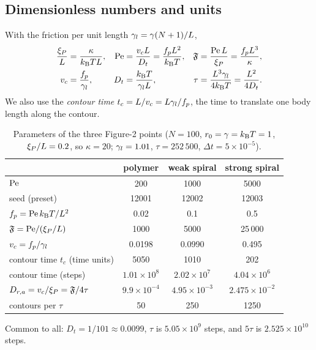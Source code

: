 \documentclass[11pt]{article}
\begin{document}
\subsection{Dimensionless numbers and units}
With the friction per unit length $\gamma_{l}=\gamma(N+1)/L$,
\begin{align}
\frac{\xi_{P}}{L}&=\frac{\kappa}{k_{\mathrm{B}}T L}, &
\mathrm{Pe}&=\frac{v_cL}{D_t}=\frac{f_pL^2}{k_{\mathrm{B}}T}, &
\mathfrak{F}&=\frac{\mathrm{Pe}\,L}{\xi_{P}}=\frac{f_pL^3}{\kappa}, \\
v_c&=\frac{f_p}{\gamma_{l}}, & D_t&=\frac{k_{\mathrm{B}}T}{\gamma_{l} L}, & \tau&=\frac{L^3\gamma_{l}}{4k_{\mathrm{B}}T}=\frac{L^2}{4D_t}.
\end{align}
We also use the \emph{contour time} $t_c=L/v_c=L\gamma_{l}/f_p$, the time to translate one body length along the contour.
\begin{table}[H]\centering\small
\caption{Parameters of the three Figure-2 points ($N=100$, $r_0=\gamma=k_{\mathrm{B}}T=1$, $\xi_{P}/L=0.2$, so $\kappa=20$; $\gamma_{l}=1.01$, $\tau=252\,500$, $\Delta t=5\times10^{-5}$).}
\label{tab:params}
\begin{tabular}{lccc}
\toprule
& polymer & weak spiral & strong spiral \\ \midrule
$\mathrm{Pe}$ & 200 & 1000 & 5000 \\
seed (preset) & 12001 & 12002 & 12003 \\
$f_p=\mathrm{Pe}\,k_{\mathrm{B}}T/L^2$ & 0.02 & 0.1 & 0.5 \\
$\mathfrak{F}=\mathrm{Pe}/(\xi_{P}/L)$ & 1000 & 5000 & 25\,000 \\
$v_c=f_p/\gamma_{l}$ & 0.0198 & 0.0990 & 0.495 \\
contour time $t_c$ (time units) & 5050 & 1010 & 202 \\
contour time (steps) & $1.01\times10^{8}$ & $2.02\times10^{7}$ & $4.04\times10^{6}$ \\
$D_{r,a}=v_c/\xi_{P}=\mathfrak{F}/4\tau$ & $9.9\times10^{-4}$ & $4.95\times10^{-3}$ & $2.475\times10^{-2}$ \\
contours per $\tau$ & 50 & 250 & 1250 \\ \bottomrule
\end{tabular}
\end{table}
Common to all: $D_t=1/101\approx0.0099$, $\tau$ is $5.05\times10^9$ steps, and $5\tau$ is $2.525\times10^{10}$ steps.
\end{document}
